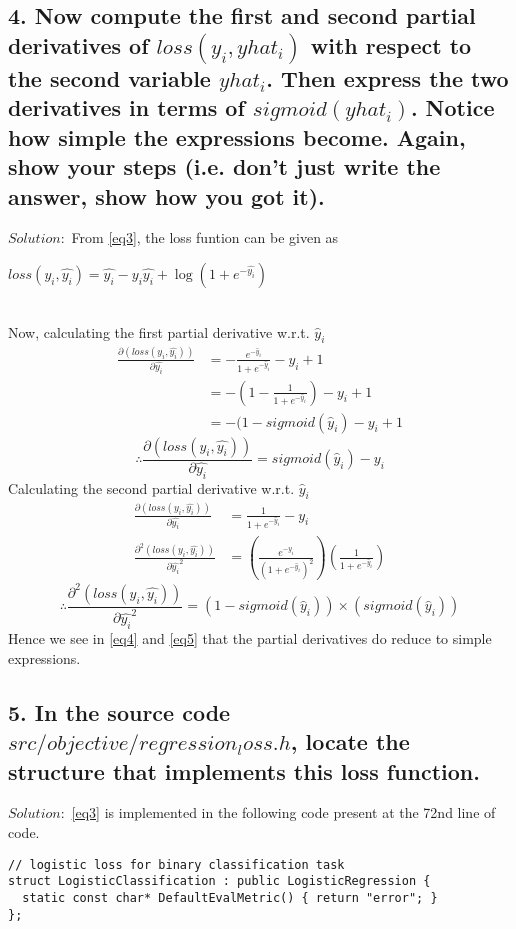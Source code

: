 \documentclass[12pt]{extarticle}
\newcommand{\<}{\langle}
\renewcommand{\>}{\rangle}
\theoremstyle{definition}
\begin{document}
\subsection*{4.  Now compute the first and second partial derivatives of $loss(y_i, yhat_i)$ with respect to the second variable $yhat_i$. Then express the two derivatives in terms of $sigmoid(yhat_i)$. Notice how simple the expressions become. Again, show your steps (i.e. don’t just write the answer, show how you got it).}
$Solution:$ From \eqref{eq3}, the loss funtion can be given as
\centerline{$loss(y_i,\hat{y_i}) = \hat{y_i} - {y_i}{\hat{y_i}} + \log{(1+e^{-\hat{y_i}})}$}\\
Now, calculating the first partial derivative w.r.t. $\hat y_i$
\begin{align*}
 \frac{\partial{(loss(y_i,\hat{y_i}))}}{\partial{\hat{y_i}}} &= -\frac{e^{-\hat y_i}}{1+e^{-\hat y_i}} - y_i +1
 \\&= -(1 - \frac{1}{1+e^{-\hat y_i}}) - y_i + 1
 \\&= -(1 - sigmoid({\hat y_i}) - y_i +1
\end{align*}
\begin{equation}
 \therefore \frac{\partial{(loss(y_i,\hat{y_i}))}}{\partial{\hat{y_i}}} = sigmoid(\hat y_i) - y_i
\label{eq4}\end{equation}
Calculating the second partial derivative w.r.t. $\hat y_i$
\begin{align*}
 \frac{\partial{(loss(y_i,\hat{y_i}))}}{\partial{\hat{y_i}}} &= \frac{1}{1+e^{-\hat y_i}} - y_i\\
 \frac{\partial^{2}{(loss(y_i,\hat{y_i}))}}{\partial{\hat{y_i}}^{2}} &= (\frac{e^{-\hat y_i}}{(1+e^{-\hat y_i})^2})(\frac{1}{1+e^{-\hat y_i}})
\end{align*}
\begin{equation}
 \therefore \frac{\partial^{2}{(loss(y_i,\hat{y_i}))}}{\partial{\hat{y_i}}^{2}} = (1 - sigmoid({\hat y_i})) \times (sigmoid(\hat y_i))
\label{eq5}\end{equation}
Hence we see in \eqref{eq4} and \eqref{eq5} that the partial derivatives do reduce to simple expressions.
\newline\newline

\subsection*{5.  In the source code $src/objective/regression_loss.h$, locate the structure that implements this loss function.}
$Solution:$ \eqref{eq3} is implemented in the following code present at the 72nd line of code.
\begin{lstlisting}
// logistic loss for binary classification task
struct LogisticClassification : public LogisticRegression {
  static const char* DefaultEvalMetric() { return "error"; }
}; 
\end{lstlisting}
\end{document}
